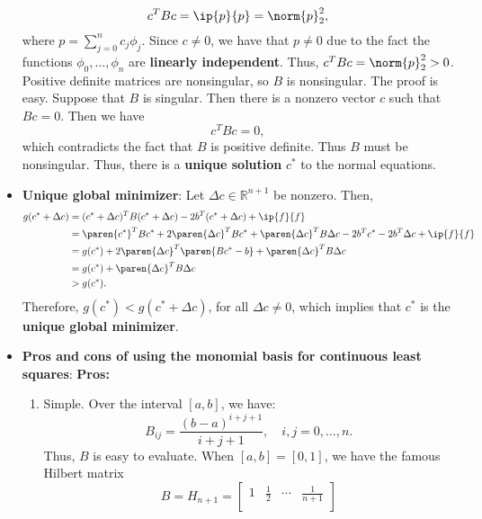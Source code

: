 \documentclass{report}
\begin{document}
\begin{itemize}
                $$c^T B c = \ip{p}{p} = \norm{p}_2^2,$$
                where $p = \sum_{j=0}^n c_j \phi_j$. Since $c \neq 0$, we have that $p \neq 0$ due to the fact the functions $\phi_0,\ldots,\phi_n$ are \textbf{linearly independent}. Thus, $c^T B c = \norm{p}_2^2 > 0$.
                \bigbreak \noindent 
                Positive definite matrices are nonsingular, so $B$ is nonsingular.
                \bigbreak \noindent 
                The proof is easy. Suppose that $B$ is singular. Then there is a nonzero vector $c$ such that $Bc = 0$. Then we have
                $$c^T B c = 0,$$
                which contradicts the fact that $B$ is positive definite. Thus $B$ must be nonsingular.
                Thus, there is a \textbf{unique solution} $c^*$ to the normal equations.
            \item \textbf{ Unique global minimizer}:
                Let $\Delta c \in \mathbb{R}^{n+1}$ be nonzero. Then,
                $$
                \begin{align}
                    g(c^* + \Delta c) 
&=  (c^* + \Delta c)^T B (c^* + \Delta c) - 2b^T (c^* + \Delta c) + \ip{f}{f}\\
&=  \paren{c^*}^T B c^* + 2\paren{\Delta c}^T B c^* +  \paren{\Delta c}^T B \Delta c - 2b^T c^* - 2b^T \Delta c + \ip{f}{f}\\
&= g(c^*) + 2\paren{\Delta c}^T \paren{B c^* - b} +  \paren{\Delta c}^T B \Delta c \\
&= g(c^*) +  \paren{\Delta c}^T B \Delta c \\
&> g(c^*). \\
                \end{align}
                $$
                Therefore, $g(c^*) < g(c^* + \Delta c)$, for all $\Delta c \neq 0$, which implies that $c^*$ is the \textbf{unique global minimizer}.
            \item \textbf{Pros and cons of using the monomial basis for continuous least squares}:
                \textbf{Pros:}
                \begin{enumerate}
                    \item Simple. Over the interval $[a,b]$, we have:
                    $$B_{ij} = \frac{(b-a)^{i+j+1}}{i+j+1}, \quad i,j = 0,\ldots,n.$$
                    Thus, $B$ is easy to evaluate. When $[a,b] = [0,1]$, we have the famous Hilbert matrix
                    $$B = H_{n+1} =
                    \begin{bmatrix}
                        1 & \frac12 & \cdots & \frac{1}{n+1} \\

\end{bmatrix}$$
\end{enumerate}
\end{itemize}
\end{document}
